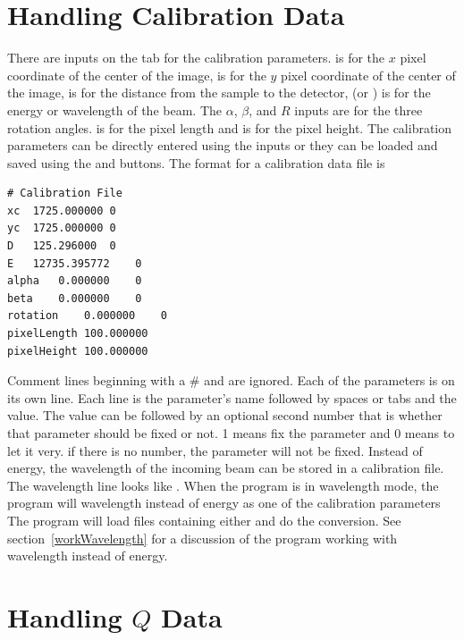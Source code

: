 \section{Handling Calibration Data}

There are inputs on the  tab 
for the calibration parameters.
 is for the $x$ pixel coordinate of the center of
the image,  is for the $y$ pixel coordinate of
the center of the image,  is for the distance from
the sample to the detector,
 (or \gui{$\lambda$:}) is for the energy
or wavelength of the beam. The $\alpha$, $\beta$, and
$R$ inputs are for the three rotation angles. 
 is for the pixel length
and  is for the pixel height.
The calibration parameters can be directly entered
using the inputs or they can be loaded and saved 
using the  and  
buttons. The format for a calibration data file is 
\begin{lstlisting}
# Calibration File
xc	1725.000000	0
yc	1725.000000	0
D	125.296000	0
E	12735.395772	0
alpha	0.000000	0
beta	0.000000	0
rotation	0.000000	0
pixelLength	100.000000
pixelHeight	100.000000
\end{lstlisting}
Comment lines beginning with
a \# and are ignored. Each of the parameters
is on its own line. Each line is the parameter's 
name followed by spaces or tabs and the
value. The value can be followed by an optional
second number that is whether that parameter
should be fixed or not. 1 means fix the parameter and 0 
means to let it very. if there is no number, the parameter will
not be fixed. Instead of energy, the wavelength of the incoming
beam can be stored in a calibration file.
The wavelength line looks like 
.
When the program is in wavelength mode, the program
will wavelength instead of energy as one of the calibration parameters 
The program will load files containing either and do the 
conversion. See section~\ref{workWavelength} for a discussion
of the program working with wavelength instead of energy.


\section{\texorpdfstring{Handling $Q$ Data}{Handling Q Data}}
\label{TheQValues}

